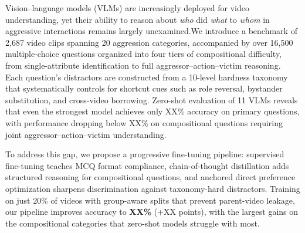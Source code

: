 \begin{abstract}
Vision--language models (VLMs) are increasingly deployed for video
understanding, yet their ability to reason about \emph{who} did
\emph{what} to \emph{whom} in aggressive interactions remains largely
unexamined.
We introduce a benchmark of 2,687 video clips spanning 20 aggression
categories, accompanied by over 16,500 multiple-choice questions
organized into four tiers of compositional difficulty, from single-attribute
identification to full aggressor--action--victim reasoning.
Each question's distractors are constructed from a 10-level hardness
taxonomy that systematically controls for shortcut cues such as role
reversal, bystander substitution, and cross-video borrowing.
Zero-shot evaluation of 11 VLMs (7--72B parameters) reveals that even
the strongest model achieves only 46\% accuracy on primary questions,
with performance dropping below 34\% on compositional questions
requiring joint aggressor--action--victim understanding.
To address this gap, we propose a progressive fine-tuning pipeline:
supervised fine-tuning teaches MCQ format compliance, chain-of-thought
distillation adds structured reasoning for compositional questions, and
anchored direct preference optimization sharpens discrimination against
taxonomy-hard distractors.
Training on just 20\% of videos with group-aware splits that prevent
parent-video leakage, our pipeline improves accuracy to \textbf{XX\%}
(+XX points), with the largest gains on the compositional categories
that zero-shot models struggle with most.
\end{abstract}


Vision--language models (VLMs) are increasingly deployed for video understanding, yet their ability to reason about \emph{who} did \emph{what} to \emph{whom} in aggressive interactions remains largely unexamined.We introduce a benchmark of 2,687 video clips spanning 20 aggression categories, accompanied by over 16,500 multiple-choice questions organized into four tiers of compositional difficulty, from single-attribute identification to full aggressor--action--victim reasoning. Each question's distractors are constructed from a 10-level hardness taxonomy that systematically controls for shortcut cues such as role reversal, bystander substitution, and cross-video borrowing. Zero-shot evaluation of 11 VLMs reveals that even the strongest model achieves only XX\% accuracy on primary questions, with performance dropping below XX\% on compositional questions requiring joint aggressor--action--victim understanding.
  
To address this gap, we propose a progressive fine-tuning pipeline: supervised fine-tuning teaches MCQ format compliance, chain-of-thought distillation adds structured reasoning for compositional questions, and anchored direct preference optimization sharpens discrimination against taxonomy-hard distractors.
Training on just 20\% of videos with group-aware splits that prevent
parent-video leakage, our pipeline improves accuracy to \textbf{XX\%}
(+XX points), with the largest gains on the compositional categories
that zero-shot models struggle with most.